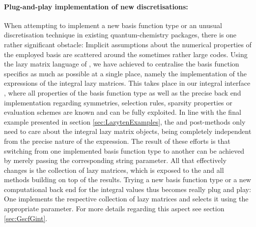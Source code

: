 \paragraph{Plug-and-play implementation of new discretisations:}
When attempting to implement a new basis function type or an unusual discretisation technique
in existing quantum-chemistry packages,
there is one rather significant obstacle:
Implicit assumptions about the numerical properties of the employed basis
are scattered around the sometimes rather large codes.
Using the lazy matrix language of \lazyten,
we have achieved to centralise the basis function specifics as much as possible
at a single place,
namely the implementation of the \contraction expressions
of the integral lazy matrices.
This takes place in our integral interface \gint,
where all properties of the basis function type
as well as the precise back end implementation
regarding symmetries, selection rules, sparsity properties
or evaluation schemes are known and can be fully exploited.
In line with the final example presented in section \vref{sec:LazytenExamples},
the \SCF and post-\HF methods only need to care about the
integral lazy matrix objects,
being completely independent from the precise nature of the \contraction expression.
The result of these efforts is that switching from one implemented
basis function type to another can be achieved by merely passing
the corresponding string parameter.
All that effectively changes is the collection of lazy matrices,
which is exposed to the \SCF and all methods building on top
of the \SCF results.
Trying a new basis function type
or a new computational back end for the integral values
thus becomes really plug and play:
One implements the respective collection of lazy matrices and selects
it using the appropriate parameter.
For more details regarding this aspect see section \vref{sec:GscfGint}.
%
%
